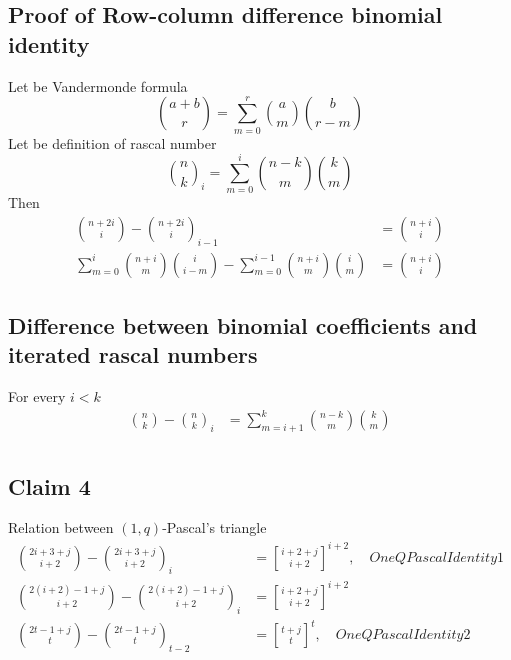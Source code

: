 \documentclass[12pt,letterpaper,oneside,reqno]{amsart}
\newcommand \rascalNumber [3] {\binom{#1}{#2}_{#3}}
\newcommand{\genstirlingI}[3]{%
    \genfrac{[}{]}{0pt}{#1}{#2}{#3}%
}
\newcommand{\oneQBinomial}[3]{\genstirlingI{}{#1}{#2}^{#3}}
\numberwithin{equation}{section}
\begin{document}
\subsection{Proof of Row-column difference binomial identity}
Let be Vandermonde formula
\begin{equation*}
    \binom{a+b}{r} = \sum_{m=0}^{r} \binom{a}{m} \binom{b}{r-m}
\end{equation*}
Let be definition of rascal number
\begin{equation*}
    \rascalNumber{n}{k}{i} = \sum_{m=0}^{i} \binom{n-k}{m} \binom{k}{m}
\end{equation*}
Then
\begin{align*}
    \binom{n+2i}{i} - \rascalNumber{n+2i}{i}{i-1} &= \binom{n+i}{i}\\
    \sum_{m=0}^{i} \binom{n+i}{m} \binom{i}{i-m} - \sum_{m=0}^{i-1} \binom{n+i}{m} \binom{i}{m} &= \binom{n+i}{i}
\end{align*}
\subsection{Difference between binomial coefficients and iterated rascal numbers}
For every $i < k$
\begin{align*}
    \binom{n}{k} - \rascalNumber{n}{k}{i} &= \sum_{m=i+1}^{k} \binom{n-k}{m} \binom{k}{m} \\
\end{align*}
\subsection{Claim 4} Relation between $(1,q)$-Pascal's triangle
\begin{align*}
    \binom{2i+3+j}{i+2} - \rascalNumber{2i+3+j}{i+2}{i} &= \oneQBinomial{i+2+j}{i+2}{i+2}, \quad OneQPascalIdentity1 \\
    \binom{2(i+2)-1+j}{i+2} - \rascalNumber{2(i+2)-1+j}{i+2}{i} &= \oneQBinomial{i+2+j}{i+2}{i+2} \\
    \binom{2t-1+j}{t} - \rascalNumber{2t-1+j}{t}{t-2} &= \oneQBinomial{t+j}{t}{t}, \quad OneQPascalIdentity2 \\
\end{align*}
\end{document}
